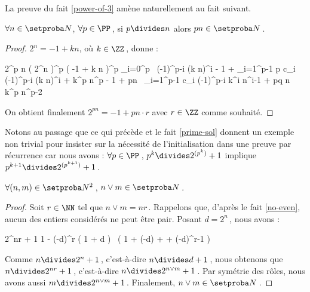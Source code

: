 La preuve du fait \ref{power-of-3} amène naturellement au fait suivant.

\begin{fact} \label{prime-divisor}
	$\forall n \in \ourset$, $\forall p \in \PP$\,,
	si $p \divides n$ alors $p n \in \ourset$\,.
\end{fact}

\begin{proof}
	$2^n = -1 + k n$, où $k \in \ZZ$\,, donne :

    \medskip
    
    \begin{stepcalc}[style=sar]
    	2^{p n}
    \explnext{}
    	\big( 2^n \big)^p
    \explnext{}
    	\big( -1 + k n \big)^p
    \explnext{}
    	\dsum_{i=0}^p  \, (-1)^{p-i} \cdot (k n)^i
    	- 1 + \dsum_{i=1}^{p-1} p c_i \cdot (-1)^{p-i} \cdot (k n)^i + k^p \cdot n^p
    	- 1 + pn \, \dsum_{i=1}^{p-1} c_i \cdot (-1)^{p-i} \cdot k^i n^{i-1} + pq \cdot n \cdot k^p \cdot n^{p-2}
    \end{stepcalc}

    \medskip

    On obtient finalement $2^{p n} = - 1 + pn \cdot r$ avec $r \in \ZZ$ comme souhaité.
\end{proof}




Notons au passage que ce qui précède et le fait \ref{prime-sol} donnent un exemple non trivial pour insister sur la nécessité de l'initialisation dans une preuve par récurrence car nous avons :
$\forall p \in \PP$\,, $p^k \divides 2^{( p^k )} + 1$ 
implique
$p^{k+1} \divides 2^{( p^{k+1} )} + 1$\,.




\begin{fact} \label{lcm}
	$\forall (n , m) \in \ourset^2$\,, $n \vee m \in \ourset$\,.
\end{fact}

\begin{proof}
	Soit $r \in \NN$ tel que $n \vee m = n r$\,. Rappelons que, d'après le fait \ref{no-even}, aucun des entiers considérés ne peut être pair.
	Posant $d = 2^n$\,, nous avons :
	
	\medskip
	
	\begin{stepcalc}[style = ar*]
		2^{nr} + 1
		1 - (-d)^r
	\explnext{}
		\big( 1 + d \big) \, \big( 1 + (-d) + \cdots + (-d)^{r-1} \big)
	\end{stepcalc}
	
	\medskip
	
	Comme $n \divides 2^n + 1$\,, c'est-à-dire $n \divides d + 1$\,, nous obtenons que $n \divides 2^{nr} + 1$\,, c'est-à-dire $n \divides 2^{n \vee m} + 1$\,.
	Par symétrie des rôles, nous avons aussi $m \divides 2^{n \vee m} + 1$\,.
	Finalement, $n \vee m \in \ourset$\,.
\end{proof}



